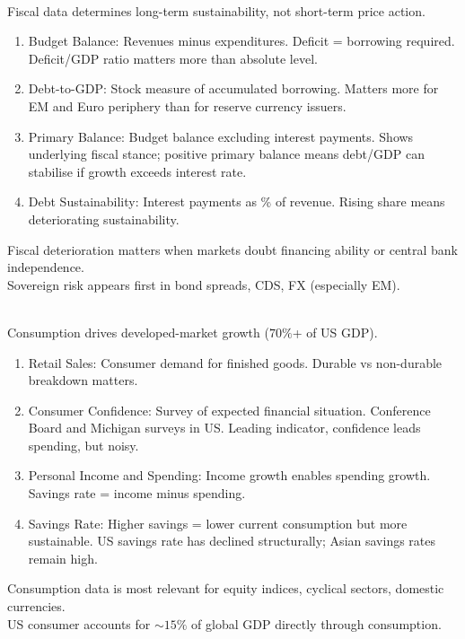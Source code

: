 \begin{remark} \\
Fiscal data determines long-term sustainability, not short-term price action.
\begin{enumerate}[label=\roman*.]
\setlength{\itemsep}{0pt}
\item Budget Balance: Revenues minus expenditures. Deficit = borrowing required. Deficit/GDP ratio matters more than absolute level.
\item Debt-to-GDP: Stock measure of accumulated borrowing. Matters more for EM and Euro periphery than for reserve currency issuers.
\item Primary Balance: Budget balance excluding interest payments. Shows underlying fiscal stance; positive primary balance means debt/GDP can stabilise if growth exceeds interest rate.
\item Debt Sustainability: Interest payments as \% of revenue. Rising share means deteriorating sustainability.
\end{enumerate}
Fiscal deterioration matters when markets doubt financing ability or central bank independence.\\
Sovereign risk appears first in bond spreads, CDS, FX (especially EM).
\end{remark}

\begin{remark} \\
Consumption drives developed-market growth ($70\%$+ of US GDP).
\begin{enumerate}[label=\roman*.]
\setlength{\itemsep}{0pt}
\item Retail Sales: Consumer demand for finished goods. Durable vs non-durable breakdown matters.
\item Consumer Confidence: Survey of expected financial situation. Conference Board and Michigan surveys in US. Leading indicator, confidence leads spending, but noisy.
\item Personal Income and Spending: Income growth enables spending growth. Savings rate = income minus spending.
\item Savings Rate: Higher savings = lower current consumption but more sustainable. US savings rate has declined structurally; Asian savings rates remain high.
\end{enumerate}
Consumption data is most relevant for equity indices, cyclical sectors, domestic currencies.\\
US consumer accounts for $\sim 15\%$ of global GDP directly through consumption.
\end{remark}

